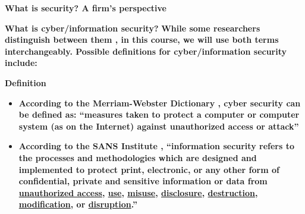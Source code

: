\documentclass[aspectratio=169]{beamer} %
\begin{document}
\begin{frame}{\textbf{What is security? A firm's perspective}}
	\centering 
	
	
	
\end{frame}

\begin{frame}{\textbf{What is cyber/information security?}}
	\textbf{While some researchers distinguish between them \cite{von2013information}, in this course, we will use both terms \textcolor{miamired}{interchangeably}. Possible \textcolor{miamired}{definitions for cyber/information security include:}}

	\begin{block}{\textbf{Definition}}
		\begin{itemize}
			\item \textbf{According to the Merriam-Webster Dictionary \cite{mWebster2020cybersec}, cyber security can be defined as: \textcolor{miamired}{``measures taken to protect a computer or computer system (as on the Internet) against unauthorized access or attack''}}
			
				
			\item \textbf{According to the SANS Institute \cite{sans2020infosec},  \textcolor{miamired}{``information security refers to the processes and methodologies which are designed and implemented to protect print, electronic, or any other form of confidential, private and sensitive information or data from \ul{unauthorized access}, \ul{use}, \ul{misuse}, \ul{disclosure}, \ul{destruction}, \ul{modification}, or \ul{disruption}.''}}
		\end{itemize}
		
	\end{block}
\end{frame}
\end{document}
